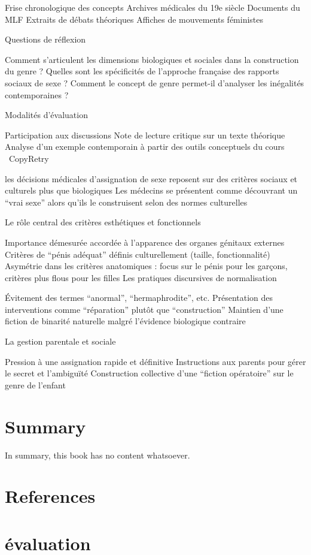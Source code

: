 \documentclass[
  letterpaper,
  DIV=11,
  numbers=noendperiod]{scrreprt}
\newlength{\cslhangindent}
\newenvironment{CSLReferences}[2] %
 {\begin{list}{}{%
  \setlength{\itemindent}{0pt}
  \setlength{\leftmargin}{0pt}
  \setlength{\parsep}{0pt}
  \ifodd #1
   \setlength{\leftmargin}{\cslhangindent}
   \setlength{\itemindent}{-1\cslhangindent}
  \fi
  \setlength{\itemsep}{#2\baselineskip}}}
 {\end{list}}
\begin{document}
Frise chronologique des concepts Archives médicales du 19e siècle
Documents du MLF Extraits de débats théoriques Affiches de mouvements
féministes

Questions de réflexion

Comment s'articulent les dimensions biologiques et sociales dans la
construction du genre ? Quelles sont les spécificités de l'approche
française des rapports sociaux de sexe ? Comment le concept de genre
permet-il d'analyser les inégalités contemporaines ?

Modalités d'évaluation

Participation aux discussions Note de lecture critique sur un texte
théorique Analyse d'un exemple contemporain à partir des outils
conceptuels du cours ~CopyRetry

les décisions médicales d'assignation de sexe reposent sur des critères
sociaux et culturels plus que biologiques Les médecins se présentent
comme découvrant un ``vrai sexe'' alors qu'ils le construisent selon des
normes culturelles

Le rôle central des critères esthétiques et fonctionnels

Importance démesurée accordée à l'apparence des organes génitaux
externes Critères de ``pénis adéquat'' définis culturellement (taille,
fonctionnalité) Asymétrie dans les critères anatomiques : focus sur le
pénis pour les garçons, critères plus flous pour les filles Les
pratiques discursives de normalisation

Évitement des termes ``anormal'', ``hermaphrodite'', etc. Présentation
des interventions comme ``réparation'' plutôt que ``construction''
Maintien d'une fiction de binarité naturelle malgré l'évidence
biologique contraire

La gestion parentale et sociale

Pression à une assignation rapide et définitive Instructions aux parents
pour gérer le secret et l'ambiguïté Construction collective d'une
``fiction opératoire'' sur le genre de l'enfant


\chapter{Summary}\label{summary}

In summary, this book has no content whatsoever.


\chapter*{References}\label{references}


\label{refs}
\begin{CSLReferences}{0}{1}
\end{CSLReferences}


\chapter{évaluation}\label{uxe9valuation}
\end{document}
